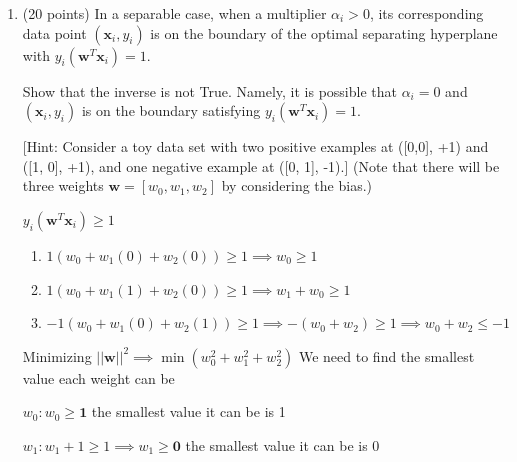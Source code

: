 \documentclass[11pt]{article}
\begin{document}
\begin{enumerate}
{eliminate $\alpha_1$:
    \begin{align*}
    (1 - \alpha_1 - \alpha_2 + \alpha_3) & = 0 \\
    + (1 + \alpha_1 + 5\alpha_2 - 5\alpha_3) & = 0 \\
     \hline
    2 + 4\alpha_2 - 4\alpha_3 & = 0
    \end{align*}


substitute $\alpha_2 = .5$ into eliminated equation:
$2 + 4(.5) - 4(\alpha_3) = 0 \implies 4 - 4\alpha_3 = 0 \implies \alpha_3 = 1$

substitute $\alpha_2 = .5 , \alpha_3 =1$ into equation (a):
$1 - \alpha_1 - .5 + 1 = 0 \implies 1.5 = \alpha_1 $

The optimal Lagrange multipliers are:
\[ \alpha^* = [1.5, 0.5, 1.0] \]

}

\item (20 points) In a separable case, when a multiplier
$\alpha_i > 0$, its corresponding data point $(\boldsymbol x_i,
y_i)$ is on the boundary of the optimal separating hyperplane
with $y_i(\boldsymbol w^T \boldsymbol x_i) = 1$.

Show that the inverse is not True. Namely, it is possible that
$\alpha_i = 0$ and $(\boldsymbol x_i, y_i)$ is on the boundary
satisfying $y_i(\boldsymbol w^T \boldsymbol x_i) = 1$.

[Hint: Consider a toy data set with two positive examples at
([0,0], +1) and ([1, 0], +1), and one negative example at ([0,
1], -1).] (Note that there will be three weights $\boldsymbol w =
[w_0, w_1, w_2]$ by considering the bias.)


{\color{red}
 $y_i(\boldsymbol{w}^T \boldsymbol{x}_i) \ge 1$ 
\begin{enumerate}
    \item $1(w_0 + w_1(0) + w_2(0)) \ge 1 \implies w_0 \ge 1$
    \item $1(w_0 + w_1(1) + w_2(0)) \ge 1 \implies w_1 + w_0 \ge 1$
    \item $-1(w_0 + w_1(0) + w_2(1)) \ge 1 \implies -(w_0+w_2) \ge 1 \implies w_0 + w_2\le -1$
\end{enumerate}

Minimizing $||\boldsymbol{w}||^2 \implies \min(w_0^2 + w_1^2 + w_2^2)$
We need to find the smallest value each weight can be

$w_0: w_0 \ge \textbf{1}$ the smallest value it can be is 1

$w_1:  w_1 + 1 \ge 1 \implies w_1 \ge \textbf{0}$ the smallest value it can be is 0

}
\end{enumerate}
\end{document}
